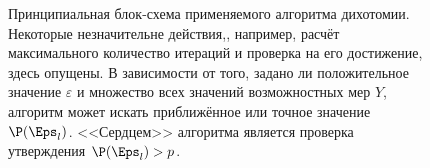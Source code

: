 \begin{figure}[h!]
\caption{\small Принципиальная блок-схема применяемого алгоритма дихотомии. Некоторые незначительне действия,, например, расчёт максимального количество итераций и проверка на его достижение, здесь опущены. В зависимости от того, задано ли положительное значение $\varepsilon$ и множество всех значений возможностных мер $Y$, алгоритм может искать приближённое или точное значение $\P(\Eps_l)$. <<Сердцем>> алгоритма является проверка утверждения $\P(\Eps_l) > p$.}
\label{ris:algo_scheme}
\end{figure}

